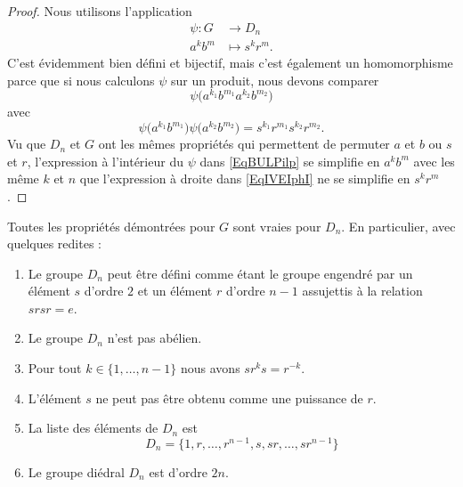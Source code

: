 \begin{proof}
        Nous utilisons l'application
    \begin{equation}
        \begin{aligned}
            \psi\colon G&\to D_n \\
            a^kb^m&\mapsto s^kr^m. 
        \end{aligned}
    \end{equation}
    C'est évidemment bien défini et bijectif, mais c'est également un homomorphisme parce que si nous calculons \( \psi\) sur un produit, nous devons comparer
    \begin{equation}        \label{EqBULPilp}
        \psi\big( a^{k_1}b^{m_1}a^{k_2}b^{m_2} \big)
    \end{equation}
    avec
    \begin{equation}        \label{EqIVEIphI}
        \psi\big( a^{k_1}b^{m_1}\big)\psi\big(a^{k_2}b^{m_2} \big)= s^{k_1}r^{m_1}s^{k_2}r^{m_2}.
    \end{equation}
    Vu que \( D_n\) et \( G\) ont les mêmes propriétés qui permettent de permuter \( a\) et \( b\) ou \( s\) et \( r\), l'expression à l'intérieur du \( \psi\) dans \eqref{EqBULPilp} se simplifie en \( a^kb^m\) avec les même \( k\) et \( n\) que l'expression à droite dans \eqref{EqIVEIphI} ne se simplifie en \( s^kr^m\).
\end{proof}

\begin{corollary}
    Toutes les propriétés démontrées pour \( G\) sont vraies pour \( D_n\). En particulier, avec quelques redites :
    \begin{enumerate}
        \item
            Le groupe \( D_n\) peut être défini comme étant le groupe engendré par un élément \( s\) d'ordre \( 2\) et un élément \( r\) d'ordre \( n-1\) assujettis à la relation \( srsr=e\).
        \item
            Le groupe \( D_n\) n'est pas abélien.
        \item
            Pour tout \( k\in\{ 1,\ldots, n-1 \}\) nous avons \( sr^ks=r^{-k}\).
        \item
            L'élément \( s\) ne peut pas être obtenu comme une puissance de \( r\).
        \item
            La liste des éléments de \( D_n\) est
            \begin{equation}
                D_n=\{ 1,r,\ldots, r^{n-1},s,sr,\ldots, sr^{n-1} \}
            \end{equation}
        \item
            Le groupe diédral \( D_n\) est d'ordre \( 2n\).
    \end{enumerate}
\end{corollary}

